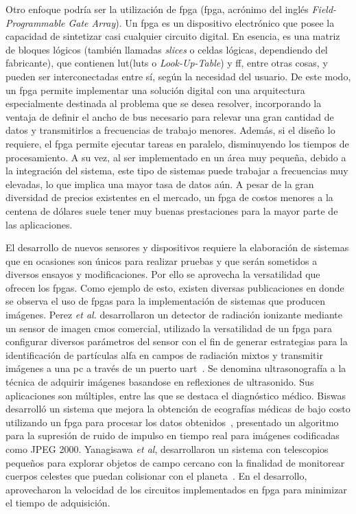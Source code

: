 Otro enfoque podría ser la utilización de \acrlong{fpga} (\acrshort{fpga}, acrónimo del inglés {\it Field-Programmable Gate Array}). Un \acrshort{fpga} es un dispositivo electrónico que posee la capacidad de sintetizar casi cualquier circuito digital. En esencia, es una matriz de bloques lógicos (también llamadas {\it slices} o celdas lógicas, dependiendo del fabricante), que contienen \acrlong{lut}(\acrshort{lut}s o {\it Look-Up-Table}) y \acrfull{ff}, entre otras cosas, y pueden ser interconectadas entre sí, según la necesidad del usuario. De este modo, un \acrshort{fpga} permite implementar una solución digital con una arquitectura especialmente destinada al problema que se desea resolver, incorporando la ventaja de definir el ancho de bus necesario para relevar una gran cantidad de datos y transmitirlos a frecuencias de trabajo menores. Además, si el diseño lo requiere, el \acrshort{fpga} permite ejecutar tareas en paralelo, disminuyendo los tiempos de procesamiento. A su vez, al ser implementado en un área muy pequeña, debido a la integración del sistema, este tipo de sistemas puede trabajar a frecuencias muy elevadas, lo que implica una mayor tasa de datos aún. A pesar de la gran diversidad de precios existentes en el mercado, un \acrshort{fpga} de costos menores a la centena de dólares suele tener muy buenas prestaciones para la mayor parte de las aplicaciones.%

El desarrollo de nuevos sensores y dispositivos requiere la elaboración de sistemas que en ocasiones son únicos para realizar pruebas y que serán sometidos a diversos ensayos y modificaciones. Por ello se aprovecha la versatilidad que ofrecen los \acrshort{fpga}s. Como ejemplo de esto, existen diversas publicaciones en donde se observa el uso de \acrshort{fpga}s para la implementación de sistemas que producen imágenes. Perez \textit{et al.} desarrollaron un detector de radiación ionizante mediante un sensor de imagen \acrshort{cmos} comercial, utilizado la versatilidad de un \acrshort{fpga} para configurar diversos parámetros del sensor con el fin de generar estrategias para la identificación de partículas alfa en campos de radiación mixtos y transmitir imágenes a una \acrfull{pc} a través de un puerto \acrshort{uart}~\cite{Perez2017}. Se denomina ultrasonografía a la técnica de adquirir imágenes basandose en reflexiones de ultrasonido. Sus aplicaciones son múltiples, entre las que se destaca el diagnóstico médico. Biswas desarrolló un sistema que mejora la obtención de ecografías médicas de bajo costo utilizando un \acrshort{fpga} para procesar los datos obtenidos~\cite{biswas2018embedded}, presentado un algoritmo para la supresión de ruido de impulso en tiempo real para imágenes codificadas como JPEG 2000. Yanagisawa {\it et al}, desarrollaron un sistema con telescopios pequeños para explorar objetos de campo cercano con la finalidad de monitorear cuerpos celestes que puedan colisionar con el planeta~\cite{Yanagisawa2018}. En el desarrollo, aprovecharon la velocidad de los circuitos implementados en \acrshort{fpga} para minimizar el tiempo de adquisición.%

